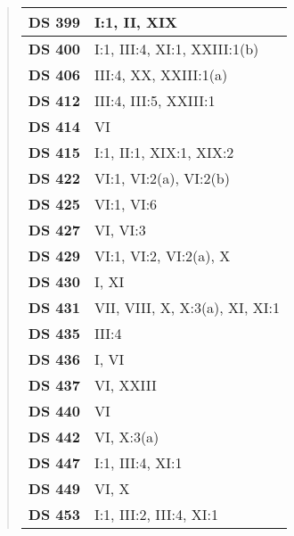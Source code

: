 \begin{quote}
\begin{xltabular}{\linewidth}{ l | X }
        \textbf {DS 399} & I:1, II, XIX \\ \hline
    
        \textbf {DS 400} & I:1, III:4, XI:1, XXIII:1(b) \\ \hline
    
        \textbf {DS 406} & III:4, XX, XXIII:1(a) \\ \hline
    
        \textbf {DS 412} & III:4, III:5, XXIII:1 \\ \hline
    
        \textbf {DS 414} & VI \\ \hline
    
        \textbf {DS 415} & I:1, II:1, XIX:1, XIX:2 \\ \hline
    
        \textbf {DS 422} & VI:1, VI:2(a), VI:2(b) \\ \hline
    
        \textbf {DS 425} & VI:1, VI:6 \\ \hline
    
        \textbf {DS 427} & VI, VI:3 \\ \hline
    
        \textbf {DS 429} & VI:1, VI:2, VI:2(a), X \\ \hline
    
        \textbf {DS 430} & I, XI \\ \hline
    
        \textbf {DS 431} & VII, VIII, X, X:3(a), XI, XI:1 \\ \hline
    
        \textbf {DS 435} & III:4 \\ \hline
    
        \textbf {DS 436} & I, VI \\ \hline
    
        \textbf {DS 437} & VI, XXIII \\ \hline
    
        \textbf {DS 440} & VI \\ \hline
    
        \textbf {DS 442} & VI, X:3(a) \\ \hline
    
        \textbf {DS 447} & I:1, III:4, XI:1 \\ \hline
    
        \textbf {DS 449} & VI, X \\ \hline
    
        \textbf {DS 453} & I:1, III:2, III:4, XI:1 \\ \hline
    

\end{xltabular}
\end{quote}
